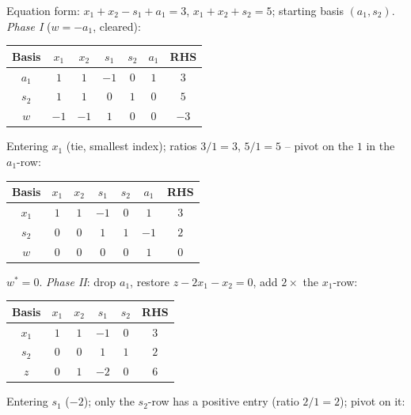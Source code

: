 \begin{solutions}
  \item Equation form: $x_{1}+x_{2}-s_{1}+a_{1}=3$,
        $x_{1}+x_{2}+s_{2}=5$; starting basis $(a_{1},s_{2})$.
        \emph{Phase I} ($w=-a_{1}$, cleared):
        \begin{center}
        \begin{tabular}{c|ccccc|c}
        Basis & $x_{1}$ & $x_{2}$ & $s_{1}$ & $s_{2}$ & $a_{1}$ & RHS\\
        \hline
        $a_{1}$ & $1$ & $1$ & $-1$ & $0$ & $1$ & $3$\\
        $s_{2}$ & $1$ & $1$ & $0$ & $1$ & $0$ & $5$\\
        \hline
        $w$ & $-1$ & $-1$ & $1$ & $0$ & $0$ & $-3$\\
        \end{tabular}
        \end{center}
        Entering $x_{1}$ (tie, smallest index); ratios $3/1=3$, $5/1=5$ --
        pivot on the $1$ in the $a_{1}$-row:
        \begin{center}
        \begin{tabular}{c|ccccc|c}
        Basis & $x_{1}$ & $x_{2}$ & $s_{1}$ & $s_{2}$ & $a_{1}$ & RHS\\
        \hline
        $x_{1}$ & $1$ & $1$ & $-1$ & $0$ & $1$ & $3$\\
        $s_{2}$ & $0$ & $0$ & $1$ & $1$ & $-1$ & $2$\\
        \hline
        $w$ & $0$ & $0$ & $0$ & $0$ & $1$ & $0$\\
        \end{tabular}
        \end{center}
        $w^{*}=0$. \emph{Phase II}: drop $a_{1}$, restore
        $z-2x_{1}-x_{2}=0$, add $2\times$ the $x_{1}$-row:
        \begin{center}
        \begin{tabular}{c|cccc|c}
        Basis & $x_{1}$ & $x_{2}$ & $s_{1}$ & $s_{2}$ & RHS\\
        \hline
        $x_{1}$ & $1$ & $1$ & $-1$ & $0$ & $3$\\
        $s_{2}$ & $0$ & $0$ & $1$ & $1$ & $2$\\
        \hline
        $z$ & $0$ & $1$ & $-2$ & $0$ & $6$\\
        \end{tabular}
        \end{center}
        Entering $s_{1}$ ($-2$); only the $s_{2}$-row has a positive entry
        (ratio $2/1=2$); pivot on it:
        \begin{center}

\end{center}
\end{solutions}
